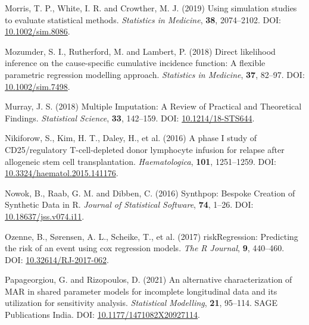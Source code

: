 \documentclass[
  letterpaper,
  paper=240mm:170mm,
  twoside=true,
  open=right,
  fontsize=10pt,
  pagesize=false,
  BCOR=15mm,
  DIV=14,
  headinclude=true,
  footinclude=false,
  headsepline=on]{scrbook}
\newlength{\cslhangindent}
\newenvironment{CSLReferences}[2] %
 {\begin{list}{}{%
  \setlength{\itemindent}{0pt}
  \setlength{\leftmargin}{0pt}
  \setlength{\parsep}{0pt}
  \ifodd #1
   \setlength{\leftmargin}{\cslhangindent}
   \setlength{\itemindent}{-1\cslhangindent}
  \fi
  \setlength{\itemsep}{#2\baselineskip}}}
 {\end{list}}
\begin{document}
\begin{CSLReferences}{1}{1}
Morris, T. P., White, I. R. and Crowther, M. J. (2019) Using simulation
studies to evaluate statistical methods. \emph{Statistics in Medicine},
\textbf{38}, 2074--2102. DOI:
\href{https://doi.org/10.1002/sim.8086}{10.1002/sim.8086}.

Mozumder, S. I., Rutherford, M. and Lambert, P. (2018) Direct likelihood
inference on the cause-specific cumulative incidence function: {A}
flexible parametric regression modelling approach. \emph{Statistics in
Medicine}, \textbf{37}, 82--97. DOI:
\href{https://doi.org/10.1002/sim.7498}{10.1002/sim.7498}.

Murray, J. S. (2018) Multiple {Imputation}: {A Review} of {Practical}
and {Theoretical Findings}. \emph{Statistical Science}, \textbf{33},
142--159. DOI:
\href{https://doi.org/10.1214/18-STS644}{10.1214/18-STS644}.

Nikiforow, S., Kim, H. T., Daley, H., et al. (2016) A phase {I} study of
{CD25}/regulatory {T-cell-depleted} donor lymphocyte infusion for
relapse after allogeneic stem cell transplantation.
\emph{Haematologica}, \textbf{101}, 1251--1259. DOI:
\href{https://doi.org/10.3324/haematol.2015.141176}{10.3324/haematol.2015.141176}.

Nowok, B., Raab, G. M. and Dibben, C. (2016) Synthpop: {Bespoke
Creation} of {Synthetic Data} in {R}. \emph{Journal of Statistical
Software}, \textbf{74}, 1--26. DOI:
\href{https://doi.org/10.18637/jss.v074.i11}{10.18637/jss.v074.i11}.

Ozenne, B., Sørensen, A. L., Scheike, T., et al. (2017)
{riskRegression}: {Predicting} the risk of an event using cox regression
models. \emph{The R Journal}, \textbf{9}, 440--460. DOI:
\href{https://doi.org/10.32614/RJ-2017-062}{10.32614/RJ-2017-062}.

Papageorgiou, G. and Rizopoulos, D. (2021) An alternative
characterization of {MAR} in shared parameter models for incomplete
longitudinal data and its utilization for sensitivity analysis.
\emph{Statistical Modelling}, \textbf{21}, 95--114. SAGE Publications
India. DOI:
\href{https://doi.org/10.1177/1471082X20927114}{10.1177/1471082X20927114}.


\end{CSLReferences}
\end{document}
